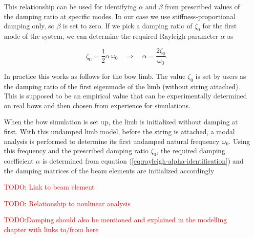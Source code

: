This relationship can be used for identifying $\alpha$ and $\beta$ from prescribed values of the damping ratio at specific modes.
In our case we use stiffness-proportional damping only, so $\beta$ is set to zero.
If we pick a damping ratio of $\zeta_{0}$ for the first mode of the system, we can determine the required Rayleigh parameter $\alpha$ as

\begin{equation}
\zeta_{0} = \frac{1}{2}\alpha\,\omega_{0} \quad \Rightarrow \quad \alpha = \frac{2\zeta_{0}}{\omega_{0}}. \label{eq:rayleigh-alpha-identification}
\end{equation}

In practice this works as follows for the bow limb.
The value $\zeta_{0}$ is set by users as the damping ratio of the first eigenmode of the limb (without string attached).
This is supposed to be an empirical value that can be experimentally determined on real bows and then chosen from experience for simulations.

When the bow simulation is set up, the limb is initialized without damping at first.
With this undamped limb model, before the string is attached, a modal analysis is performed to determine its first undamped natural frequency $\omega_{0}$.
Using this frequency and the prescribed damping ratio $\zeta_{0}$, the required damping coefficient $\alpha$ is determined from equation (\ref{eq:rayleigh-alpha-identification}) and the damping matrices of the beam elements are initialized accordingly

\textcolor{red}{TODO: Link to beam element}

\textcolor{red}{TODO: Relationship to nonlinear analysis}

\textcolor{red}{TODO:Damping should also be mentioned and explained in the modelling chapter with links to/from here}
